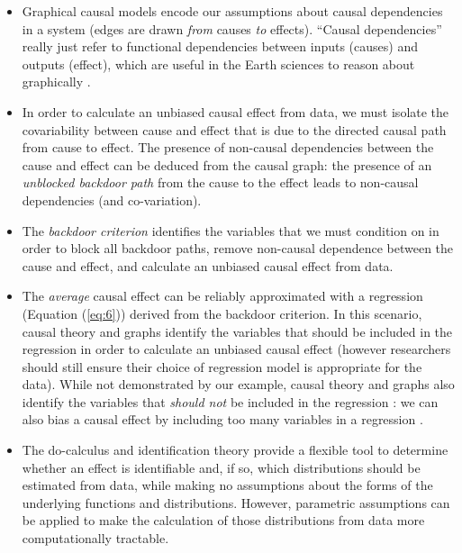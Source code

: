 \documentclass[12pt]{article}
\begin{document}
\begin{itemize}
\item Graphical causal models encode our assumptions about causal
  dependencies in a system (edges are drawn \emph{from} causes
  \emph{to} effects). ``Causal dependencies'' really just refer to
  functional dependencies between inputs (causes) and outputs
  (effect), which are useful in the Earth sciences to reason about
  graphically .
\item In order to calculate an unbiased causal effect from data, we
  must isolate the covariability between cause and effect that is due
  to the directed causal path from cause to effect. The presence of
  non-causal dependencies between the cause and effect can be deduced
  from the causal graph: the presence of an \textit{unblocked backdoor
    path} from the cause to the effect leads to non-causal
  dependencies (and co-variation).
\item The \emph{backdoor criterion} identifies the variables that we
  must condition on in order to block all backdoor paths, remove
  non-causal dependence between the cause and effect, and calculate an
  unbiased causal effect from data.
\item The \emph{average} causal effect can be reliably approximated
  with a regression (Equation (\ref{eq:6})) derived from the backdoor
  criterion. In this scenario, causal theory and graphs identify the
  variables that should be included in the regression in order to
  calculate an unbiased causal effect (however researchers should
  still ensure their choice of regression model is appropriate for the
  data). While not demonstrated by our example, causal theory and
  graphs also identify the variables that \textit{should not} be
  included in the regression \citep{pearl2009}: we can also bias a
  causal effect by including too many variables in a regression .
\item The do-calculus and identification theory provide a flexible
  tool to determine whether an effect is identifiable and, if so,
  which distributions should be estimated from data, while making no
  assumptions about the forms of the underlying functions and
  distributions. However, parametric assumptions can be applied to
  make the calculation of those distributions from data more
  computationally tractable.
\end{itemize}
\end{document}
